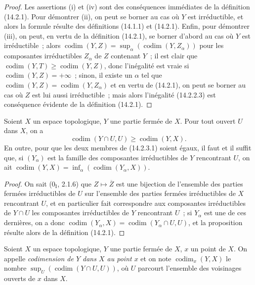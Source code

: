\begin{proof}
Les assertions (i) et (iv) sont des conséquences immédiates de la définition
(14.2.1). Pour démontrer (ii), on peut se borner au cas où $Y$ est
irréductible, et alors la formule résulte des définitions (14.1.1) et
(14.2.1). Enfin, pour démontrer (iii), on peut, en vertu de la définition
(14.2.1), se borner d'abord au cas où $Y$ est irréductible~; alors
$\operatorname{codim}(Y,Z)=
\sup_\alpha(\operatorname{codim}(Y,Z_\alpha))$ pour les composantes
irréductibles $Z_\alpha$ de $Z$ contenant $Y$~; il est clair que
$\operatorname{codim}(Y,T)\geq\operatorname{codim}(Y,Z)$, donc l'inégalité
est vraie si $\operatorname{codim}(Y,Z)=+\infty$~; sinon, il existe un
$\alpha$ tel que
$\operatorname{codim}(Y,Z)=\operatorname{codim}(Y,Z_\alpha)$ et en vertu de
(14.2.1), on peut se borner au cas où $Z$ est lui aussi irréductible~; mais
alors l'inégalité (14.2.2.3) est conséquence évidente de la définition
(14.2.1).
\end{proof}

\begin{proposition}[14.2.3]
\label{0.14.2.3-fr}
Soient $X$ un espace topologique, $Y$ une partie fermée de $X$. Pour tout
ouvert $U$ dans $X$, on a
\[
  \operatorname{codim}(Y\cap U,U)\geq\operatorname{codim}(Y,X).
  \tag{14.2.3.1}\label{0.14.2.3.1-fr}
\]
En outre, pour que les deux membres de (14.2.3.1) soient égaux, il faut et il
suffit que, si $(Y_\alpha)$ est la famille des composantes irréductibles de
$Y$ rencontrant $U$, on ait
$\operatorname{codim}(Y,X)=
\inf_\alpha(\operatorname{codim}(Y_\alpha,X))$.
\end{proposition}

\begin{proof}
On sait ($0_{\mathrm I}$, 2.1.6) que $Z\mapsto\overline Z$ est une bijection
de l'ensemble des parties fermées irréductibles de $U$ sur l'ensemble des
parties fermées irréductibles de $X$ rencontrant $U$, et en particulier fait
correspondre aux composantes irréductibles de $Y\cap U$ les composantes
irréductibles de $Y$ rencontrant $U$~; si $Y_\alpha$ est une de ces
dernières, on a donc
$\operatorname{codim}(Y_\alpha,X)=
\operatorname{codim}(Y_\alpha\cap U,U)$, et la proposition résulte alors de
la définition (14.2.1).
\end{proof}

\begin{definition}[14.2.4]
\label{0.14.2.4-fr}
Soient $X$ un espace topologique, $Y$ une partie fermée de $X$, $x$ un point
de $X$. On appelle \emph{codimension de $Y$ dans $X$ au point $x$} et on note
$\operatorname{codim}_x(Y,X)$ le nombre
$\sup_U(\operatorname{codim}(Y\cap U,U))$, où $U$ parcourt l'ensemble des
voisinages ouverts de $x$ dans $X$.
\end{definition}

